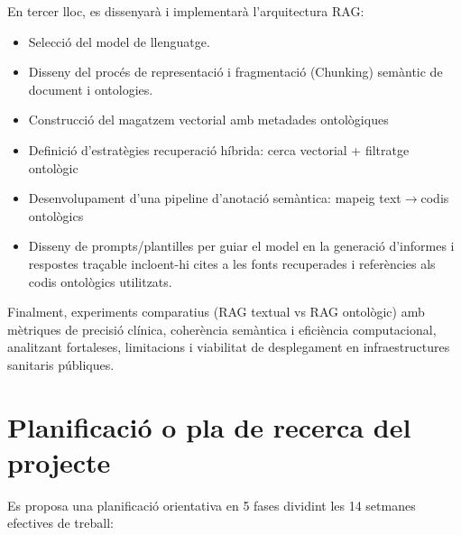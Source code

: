 \documentclass[11pt,a4paper]{article}
\begin{document}
En tercer lloc, es dissenyarà i implementarà l'arquitectura RAG: 
\begin{itemize}
\item Selecció del model de llenguatge.
\item Disseny del procés de representació i fragmentació (Chunking) semàntic de document i ontologies. 
\item Construcció del magatzem vectorial amb metadades ontològiques 
\item Definició d'estratègies recuperació híbrida: cerca vectorial + filtratge ontològic
\item Desenvolupament d'una pipeline d'anotació semàntica: mapeig text$\to$codis ontològics
\item Disseny de prompts/plantilles per guiar el model en la generació d'informes i respostes traçable incloent-hi cites a les fonts recuperades i referències als codis ontològics utilitzats.
\end{itemize}

Finalment, experiments comparatius (RAG textual vs RAG ontològic) amb mètriques de precisió clínica, coherència semàntica i eficiència computacional, analitzant fortaleses, limitacions i viabilitat de desplegament en infraestructures sanitaris públiques.


\section*{Planificació o pla de recerca del projecte}
Es proposa una planificació orientativa en 5 fases dividint les 14 setmanes efectives de treball: 
\end{document}
